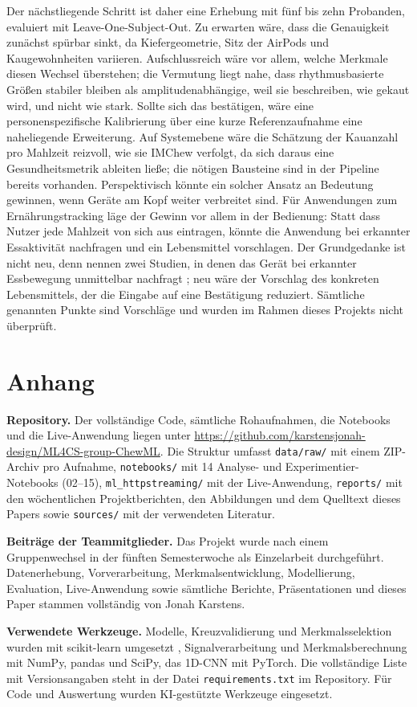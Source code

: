 \documentclass[11pt]{article}
\begin{document}
Der nächstliegende Schritt ist daher eine Erhebung mit fünf bis zehn Probanden, evaluiert
mit Leave-One-Subject-Out. Zu erwarten wäre, dass die Genauigkeit zunächst spürbar sinkt,
da Kiefergeometrie, Sitz der AirPods und Kaugewohnheiten variieren. Aufschlussreich wäre
vor allem, welche Merkmale diesen Wechsel überstehen; die Vermutung liegt nahe, dass
rhythmusbasierte Größen stabiler bleiben als amplitudenabhängige, weil sie beschreiben, wie
gekaut wird, und nicht wie stark. Sollte sich das bestätigen, wäre eine personenspezifische
Kalibrierung über eine kurze Referenzaufnahme eine naheliegende Erweiterung. Auf
Systemebene wäre die Schätzung der Kauanzahl pro Mahlzeit reizvoll, wie sie IMChew
verfolgt, da sich daraus eine Gesundheitsmetrik ableiten ließe; die nötigen Bausteine sind
in der Pipeline bereits vorhanden. Perspektivisch könnte ein solcher Ansatz an Bedeutung
gewinnen, wenn Geräte am Kopf weiter verbreitet sind. Für Anwendungen zum
Ernährungstracking läge der Gewinn vor allem in der Bedienung: Statt dass Nutzer jede
Mahlzeit von sich aus eintragen, könnte die Anwendung bei erkannter Essaktivität nachfragen
und ein Lebensmittel vorschlagen. Der Grundgedanke ist nicht neu, denn \citet{Bell2020}
nennen zwei Studien, in denen das Gerät bei erkannter Essbewegung unmittelbar nachfragt
\citep[S.~9]{Bell2020}; neu wäre der Vorschlag des konkreten Lebensmittels, der die Eingabe
auf eine Bestätigung reduziert. Sämtliche genannten Punkte sind Vorschläge und wurden im
Rahmen dieses Projekts nicht überprüft.

\medskip


\newpage
\section*{Anhang}

\textbf{Repository.} Der vollständige Code, sämtliche Rohaufnahmen, die Notebooks und die
Live-Anwendung liegen unter
\url{https://github.com/karstensjonah-design/ML4CS-group-ChewML}. Die Struktur umfasst
\texttt{data/raw/} mit einem ZIP-Archiv pro Aufnahme, \texttt{notebooks/} mit 14 Analyse-
und Experimentier-Notebooks (02--15), \texttt{ml\_httpstreaming/} mit der Live-Anwendung,
\texttt{reports/} mit den wöchentlichen Projektberichten, den Abbildungen und dem
Quelltext dieses Papers sowie
\texttt{sources/} mit der verwendeten Literatur.

\medskip
\noindent\textbf{Beiträge der Teammitglieder.} Das Projekt wurde nach einem Gruppenwechsel
in der fünften Semesterwoche als Einzelarbeit durchgeführt. Datenerhebung, Vorverarbeitung,
Merkmalsentwicklung, Modellierung, Evaluation, Live-Anwendung sowie sämtliche Berichte,
Präsentationen und dieses Paper stammen vollständig von Jonah Karstens.

\medskip
\noindent\textbf{Verwendete Werkzeuge.} Modelle, Kreuzvalidierung und Merkmalsselektion
wurden mit scikit-learn umgesetzt \citep{Pedregosa2011}, Signalverarbeitung und
Merkmalsberechnung mit NumPy, pandas und SciPy, das 1D-CNN mit PyTorch. Die vollständige
Liste mit Versionsangaben steht in der Datei \texttt{requirements.txt} im Repository. Für
Code und Auswertung wurden KI-gestützte Werkzeuge eingesetzt.
\end{document}
